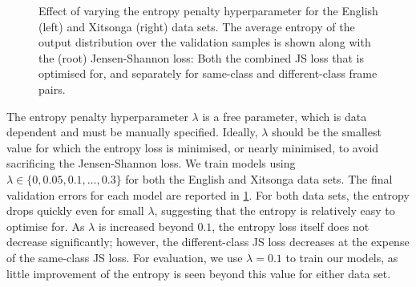 \begin{figure}
  \centering

\caption{\label{fig:entropy-penalty} Effect of varying the entropy penalty hyperparameter for the English (left) and Xitsonga (right) data sets.
The average entropy of the output distribution over the validation samples is shown along with the (root) Jensen-Shannon loss: Both the combined JS loss that is optimised for, and separately for same-class and different-class frame pairs.}
\end{figure}

The entropy penalty hyperparameter $\lambda$ is a free parameter, which is data dependent and must be manually specified.
Ideally, $\lambda$ should be the smallest value for which the entropy loss is minimised, or nearly minimised, to avoid sacrificing the Jensen-Shannon loss.
We train models using $\lambda \in \{0, 0.05, 0.1, \dots, 0.3\}$ for both the English and Xitsonga data sets.
The final validation errors for each model are reported in \cref{fig:entropy-penalty}.
For both data sets, the entropy drops quickly even for small $\lambda$, suggesting that the entropy is relatively easy to optimise for.
As $\lambda$ is increased beyond $0.1$, the entropy loss itself does not decrease significantly; however, the different-class JS loss decreases at the expense of the same-class JS loss.
For evaluation, we use $\lambda = 0.1$ to train our models, as little improvement of the entropy is seen beyond this value for either data set.

